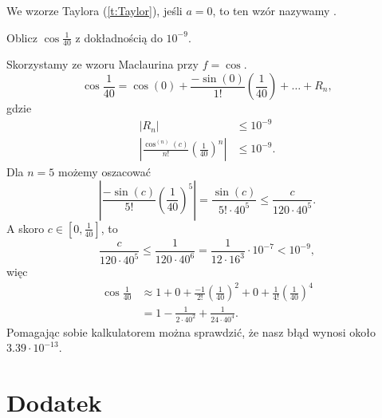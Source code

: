 \documentclass[11pt]{scrartcl}
\begin{document}
    \begin{definition}
        We wzorze Taylora (\ref{t:Taylor}), jeśli $a = 0$, to ten wzór nazywamy .
    \end{definition}

    \begin{example}
        Oblicz $\cos\frac{1}{40}$ z dokładnością do $10^{-9}$.
    \end{example}
    \begin{solution}
        Skorzystamy ze wzoru Maclaurina przy $f = \cos$.
        \[ \cos\frac{1}{40} = \cos(0) + \frac{-\sin(0)}{1!}\left(\frac{1}{40}\right) + \ldots + R_n, \]
        gdzie
        \begin{align*}
            \left|R_n\right| &\leq 10^{-9} \\
            \left|\frac{\cos^{(n)}(c)}{n!}\left(\frac{1}{40}\right)^n\right| &\leq 10^{-9}.
        \end{align*}
        Dla $n = 5$ możemy oszacować
        \[ \left|\frac{-\sin(c)}{5!}\left(\frac{1}{40}\right)^5\right| = \frac{\sin(c)}{5! \cdot 40^5} \leq \frac{c}{120 \cdot 40^5}. \]
        A skoro $c \in [0, \frac{1}{40}]$, to
        \[ \frac{c}{120 \cdot 40^5} \leq \frac{1}{120 \cdot 40^6} = \frac{1}{12 \cdot 16^3} \cdot 10^{-7} < 10^{-9}, \]
        więc
        \begin{align*}
            \cos\frac{1}{40} &\approx 1 + 0 + \frac{-1}{2!}\left(\frac{1}{40}\right)^2 + 0 + \frac{1}{4!}\left(\frac{1}{40}\right)^4 \\
            &= 1 - \frac{1}{2 \cdot 40^2} + \frac{1}{24 \cdot 40^4}.
        \end{align*}
        Pomagając sobie kalkulatorem można sprawdzić, że nasz błąd wynosi około $3.39\cdot 10^{-13}$.
    \end{solution}

    \appendix
    \section{Dodatek}
    
\end{document}
